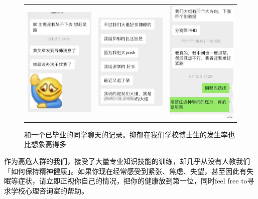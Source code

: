 \begin{figure}[H]
    \begin{tabular}{rcl}
        \includegraphics[width=0.31\columnwidth]{author-folder/Kai.Wu/chat1of3.jpg} &
        \includegraphics[width=0.31\columnwidth]{author-folder/Kai.Wu/chat2of3.jpg} &
        \includegraphics[width=0.31\columnwidth]{author-folder/Kai.Wu/chat3of3.jpg}
    \end{tabular}
    \caption{和一个已毕业的同学聊天的记录。抑郁在我们学校博士生的发生率也比想象高得多}
\end{figure}

作为高危人群的我们，接受了大量专业知识技能的训练，却几乎从没有人教我们「如何保持精神健康」。如果你现在经常感受到紧张、焦虑、失望，甚至因此有失眠等症状，请立即正视你自己的情况，把你的健康放到第一位，同时feel free to寻求学校心理咨询室的帮助。

